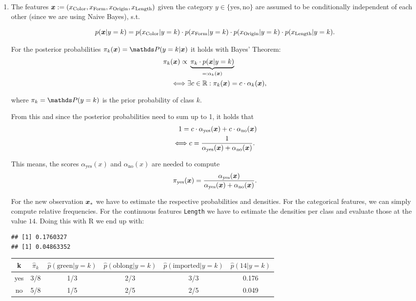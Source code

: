 \documentclass[a4paper]{article}
\makeatletter
\newenvironment{kframe}{%
 \def\at@end@of@kframe{}%
 \ifinner\ifhmode%
  \def\at@end@of@kframe{\end{minipage}}%
  \begin{minipage}{\columnwidth}%
 \fi\fi%
 \def\FrameCommand##1{\hskip\@totalleftmargin \hskip-\fboxsep
 \colorbox{shadecolor}{##1}\hskip-\fboxsep
     \hskip-\linewidth \hskip-\@totalleftmargin \hskip\columnwidth}%
 \MakeFramed {\advance\hsize-\width
   \@totalleftmargin\z@ \linewidth\hsize
   \@setminipage}}%
 {\par\unskip\endMakeFramed%
 \at@end@of@kframe}
\newenvironment{knitrout}{}{} %
\makeatother
\begin{document}
{{\begin{enumerate}
  \item The features $\bm{x} := (x_\text{Color},x_\text{Form},x_\text{Origin},
  x_\text{Length})$ given the category $y \in \{\text{yes},\text{no}\}$ are
  assumed to be conditionally independent of each other (since we are using
  Naive Bayes), s.t.

  $$p(\bm{x}|y = k) = p(x_\text{Color}|y = k)\cdot p(x_\text{Form}|y = k) \cdot
  p(x_\text{Origin}|y = k) \cdot p(x_\text{Length}|y = k).$$

  For the posterior probabilities $\pi_k(\xv) = \P(y = k | \xv)$ it holds with
  Bayes' Theorem:
  \begin{align*}
  \pi_k(\bm{x})  \propto & \; \underbrace{\pi_k \cdot p(\bm{x}|y = k)
  }_{=: \alpha_k(\bm{x})} \\
  \iff & \exists c \in \mathbb{R}: \pi_k(\bm{x}) = c \cdot \alpha_k(\bm{x}),
  \end{align*}

  where $\pi_k = \P(y = k)$ is the prior probability of class $k$.

  From this and since the posterior probabilities need to sum up to 1, it holds
  that
  \begin{align*}1 =& \; c \cdot \alpha_\text{yes}(\bm{x}) +  c \cdot
  \alpha_\text{no}(\bm{x}) \\
  \iff & c = \frac{1}{\alpha_\text{yes}(\bm{x}) + \alpha_\text{no}(\bm{x})}.
  \end{align*}

  This means, the scores $\alpha_\text{yes}(x)$ and $\alpha_\text{no}(x)$ are
  needed to compute  $$\pi_\text{yes}(\bm{x}) = \frac{\alpha_\text{yes}(\bm{x})}{
  \alpha_\text{yes}(\bm{x}) + \alpha_\text{no}(\bm{x})}. $$

  For the new observation $\bm{x}_*$ we have to estimate the respective
  probabilities and densities. For the categorical features, we can simply
  compute relative frequencies. For the continuous features \texttt{Length} we
  have to estimate the densities per class and evaluate those at the value $14$.
  Doing this with R we end up with:

\begin{knitrout}
\color{fgcolor}\begin{kframe}
\begin{verbatim}
## [1] 0.1760327
## [1] 0.04863352
\end{verbatim}
\end{kframe}
\end{knitrout}

  \begin{center}
  \begin{tabular}{ | c | c | c | c | c | c |}
  \hline
  k     &  $\hat{\pi}_k$   &  $\hat{p}(\text{green}|y = k)$    &  
  $\hat{p}(\text{oblong}|y = k)$    & $\hat{p}(\text{imported}|y = k)$    & 
  $\hat{p}(\text{14}|y = k)$   \\  \hline
  yes   &  3/8  &  1/3    &  2/3  & 3/3     &  0.176 \\
  no    &  5/8  &  1/5    &  2/5  & 2/5     &  0.049 \\
  \hline
  \end{tabular}
  \end{center}


\end{enumerate}}}
\end{document}
